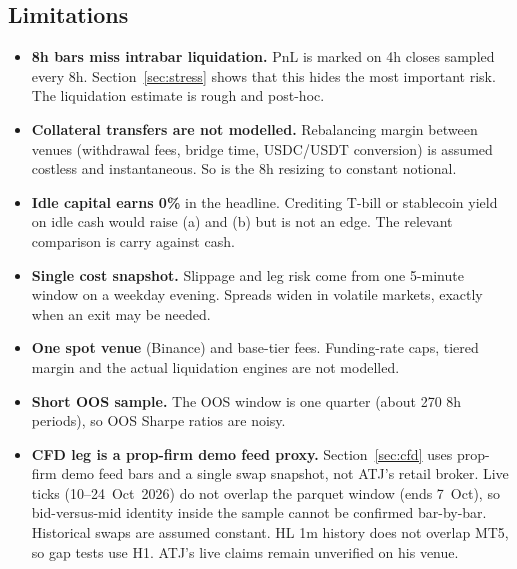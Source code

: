 \documentclass[11pt,a4paper]{article}
\begin{document}
\subsection{Limitations}
\begin{itemize}
\item \textbf{8h bars miss intrabar liquidation.} PnL is marked on 4h closes sampled every 8h. Section~\ref{sec:stress} shows that this hides the most important risk. The liquidation estimate is rough and post-hoc.
\item \textbf{Collateral transfers are not modelled.} Rebalancing margin between venues (withdrawal fees, bridge time, USDC/USDT conversion) is assumed costless and instantaneous. So is the 8h resizing to constant notional.
\item \textbf{Idle capital earns 0\%} in the headline. Crediting T-bill or stablecoin yield on idle cash would raise (a) and (b) but is not an edge. The relevant comparison is carry against cash.
\item \textbf{Single cost snapshot.} Slippage and leg risk come from one 5-minute window on a weekday evening. Spreads widen in volatile markets, exactly when an exit may be needed.
\item \textbf{One spot venue} (Binance) and base-tier fees. Funding-rate caps, tiered margin and the actual liquidation engines are not modelled.
\item \textbf{Short OOS sample.} The OOS window is one quarter (about 270 8h periods), so OOS Sharpe ratios are noisy.
\item \textbf{CFD leg is a prop-firm demo feed proxy.} Section~\ref{sec:cfd} uses prop-firm demo feed bars and a single swap snapshot, not ATJ's retail broker. Live ticks (10--24~Oct~2026) do not overlap the parquet window (ends 7~Oct), so bid-versus-mid identity inside the sample cannot be confirmed bar-by-bar. Historical swaps are assumed constant. HL 1m history does not overlap MT5, so gap tests use H1. ATJ's live claims remain unverified on his venue.
\end{itemize}
\end{document}
